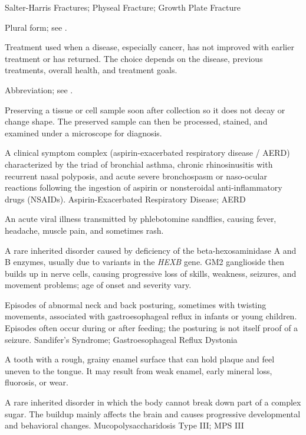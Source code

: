 \synonyms
Salter-Harris Fractures; Physeal Fracture; Growth Plate Fracture

 Plural form; see .

 Treatment used when a disease, especially cancer, has not improved with earlier treatment or has returned. The choice depends on the disease, previous treatments, overall health, and treatment goals.

 Abbreviation; see .

 Preserving a tissue or cell sample soon after collection so it does not decay or change shape. The preserved sample can then be processed, stained, and examined under a microscope for diagnosis.

 A clinical symptom complex (aspirin-exacerbated respiratory disease / AERD) characterized by the triad of bronchial asthma, chronic rhinosinusitis with recurrent nasal polyposis, and acute severe bronchospasm or naso-ocular reactions following the ingestion of aspirin or nonsteroidal anti-inflammatory drugs (NSAIDs).
\synonyms
Aspirin-Exacerbated Respiratory Disease; AERD

 An acute viral illness transmitted by phlebotomine sandflies, causing fever, headache, muscle pain, and sometimes rash.

 A rare inherited disorder caused by deficiency of the beta-hexosaminidase A and B enzymes, usually due to variants in the \textit{HEXB} gene. GM2 ganglioside then builds up in nerve cells, causing progressive loss of skills, weakness, seizures, and movement problems; age of onset and severity vary.

 Episodes of abnormal neck and back posturing, sometimes with twisting movements, associated with gastroesophageal reflux in infants or young children. Episodes often occur during or after feeding; the posturing is not itself proof of a seizure.
\synonyms
Sandifer's Syndrome; Gastroesophageal Reflux Dystonia

 A tooth with a rough, grainy enamel surface that can hold plaque and feel uneven to the tongue. It may result from weak enamel, early mineral loss, fluorosis, or wear.

 A rare inherited disorder in which the body cannot break down part of a complex sugar. The buildup mainly affects the brain and causes progressive developmental and behavioral changes.
\synonyms
Mucopolysaccharidosis Type III; MPS III


